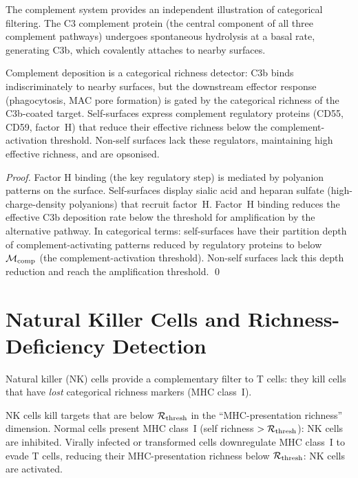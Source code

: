 The complement system provides an independent illustration of categorical
filtering. The C3 complement protein (the central component of all three
complement pathways) undergoes spontaneous hydrolysis at a basal rate,
generating C3b, which covalently attaches to nearby surfaces.

\begin{proposition}
\label{prop:complement}
Complement deposition is a categorical richness detector: C3b binds
indiscriminately to nearby surfaces, but the downstream effector response
(phagocytosis, MAC pore formation) is gated by the categorical richness of
the C3b-coated target. Self-surfaces express complement regulatory proteins
(CD55, CD59, factor~H) that reduce their effective richness below the
complement-activation threshold. Non-self surfaces lack these regulators,
maintaining high effective richness, and are opsonised.
\end{proposition}

\begin{proof}
Factor H binding (the key regulatory step) is mediated by polyanion
patterns on the surface. Self-surfaces display sialic acid and heparan
sulfate (high-charge-density polyanions) that recruit factor~H.
Factor~H binding reduces the effective C3b deposition rate below the
threshold for amplification by the alternative pathway.
In categorical terms: self-surfaces have their partition depth of
complement-activating patterns reduced by regulatory proteins to below
$\mathcal{M}_{\mathrm{comp}}$ (the complement-activation threshold). Non-self
surfaces lack this depth reduction and reach the amplification threshold. \qed
\end{proof}

\section{Natural Killer Cells and Richness-Deficiency Detection}
\label{sec:nk_cells}

Natural killer (NK) cells provide a complementary filter to T cells: they kill
cells that have \emph{lost} categorical richness markers (MHC class~I).

\begin{proposition}
\label{prop:nk_missing_self}
NK cells kill targets that are below $\mathcal{R}_{\mathrm{thresh}}$ in the
``MHC-presentation richness'' dimension. Normal cells present MHC class~I
(self richness $> \mathcal{R}_{\mathrm{thresh}}$): NK cells are inhibited.
Virally infected or transformed cells downregulate MHC class~I to evade T cells,
reducing their MHC-presentation richness below $\mathcal{R}_{\mathrm{thresh}}$:
NK cells are activated.
\end{proposition}

